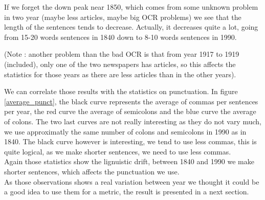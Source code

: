 If we forget the down peak near 1850, which comes from some unknown problem in two year (maybe less articles, maybe big OCR problems) we see that the length of the sentences tends to decrease. Actually, it decreases quite a lot, going from 15-20 words sentences in 1840 down to 8-10 words sentences in 1990.

(Note : another problem than the bad OCR is that from year 1917 to 1919 (included), only one of the two newspapers has articles, so this affects the statistics for those years as there are less articles than in the other years).

We can correlate those results with the statistics on punctuation. In figure \ref{average_punct}, the black curve represents the average of commas per sentences per year, the red curve the average of semicolons and the blue curve the average of colons. The two last curves are not really interesting as they do not vary much, we use approximatly the same number of colons and semicolons in 1990 as in 1840. The black curve however is interesting, we tend to use less commas, this is quite logical, as we make shorter sentences, we need to use less commas.\\

Again those statistics show the lignuistic drift, between 1840 and 1990 we make shorter sentences, which affects the punctuation we use. \\

As those observations shows a real variation between year we thought it could be a good idea to use them for a metric, the result is presented in a next section.